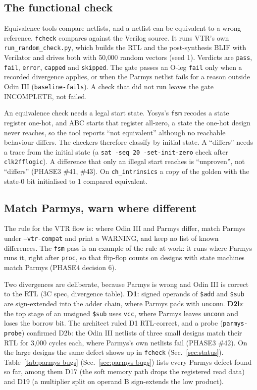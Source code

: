 \documentclass[conference]{IEEEtran}
\newcommand{\code}[1]{\texttt{#1}}
\begin{document}
\subsection{The functional check}
\label{sec:fcheck}

Equivalence tools compare netlists, and a netlist can be equivalent to a wrong reference.
\code{fcheck} compares against the Verilog source. It runs VTR's own
\code{run\_random\_check.py}, which builds the RTL and the post-synthesis BLIF with Verilator and
drives both with 50,000 random vectors (seed 1). Verdicts are \code{pass}, \code{fail},
\code{error}, \code{capped} and \code{skipped}. The gate passes an O-leg \code{fail} only when a
recorded divergence applies, or when the Parmys netlist fails for a reason outside Odin III
(\code{baseline-fails}). A check that did not run leaves the gate INCOMPLETE, not failed.

An equivalence check needs a legal start state. Yosys's \code{fsm} recodes a state register
one-hot, and ABC starts that register all-zero, a state the one-hot design never reaches, so
the tool reports ``not equivalent'' although no reachable behaviour differs. The checkers
therefore classify by initial state. A ``differs'' needs a trace from the initial state (a
\code{sat -seq 20 -set-init-zero} check after \code{clk2fflogic}). A difference that only an
illegal start reaches is ``unproven'', not ``differs'' (PHASE3 \#41, \#43). On
\code{ch\_intrinsics} a copy of the golden with the state-0 bit initialised to 1 compared
equivalent.

\subsection{Match Parmys, warn where different}
\label{sec:parmys}

The rule for the VTR flow is: where Odin III and Parmys differ, match Parmys under
\code{--vtr-compat} and print a WARNING, and keep no list of known differences. The \code{fsm} pass is an example of the rule at work: it runs where Parmys runs it, right after
\code{proc}, so that flip-flop counts on designs with state machines match Parmys (PHASE4
decision 6).

Two divergences are deliberate, because Parmys is wrong and Odin III is correct to the RTL
(3C spec, divergence table). \textbf{D1}: signed operands of \code{\$add} and \code{\$sub} are
sign-extended into the adder chain, where Parmys pads with \code{unconn}. \textbf{D2b}: the top
stage of an unsigned \code{\$sub} uses \code{vcc}, where Parmys leaves \code{unconn} and loses
the borrow bit. The architect ruled D1 RTL-correct, and a probe (\code{parmys-probe}) confirmed D2b: the Odin III
netlists of three small designs match their RTL for 3,000 cycles each, where Parmys's own
netlists fail (PHASE3 \#42). On the large designs the same defect shows up in \code{fcheck}
(Sec.~\ref{sec:status}). Table~\ref{tab:parmys-bugs} (Sec.~\ref{sec:parmys-bugs}) lists every
Parmys defect found so far, among them D17 (the soft memory path drops the registered read data)
and D19 (a multiplier split on operand B sign-extends the low product).
\end{document}
